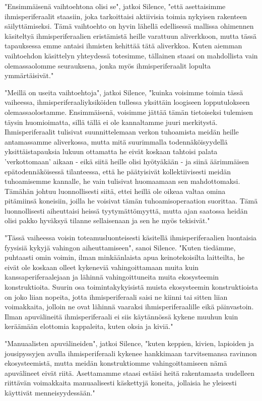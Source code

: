 "Ensimmäisenä vaihtoehtona olisi se", jatkoi Silence, "että asettaisimme ihmisperiferaalit staasiin, joka tarkoittaisi aktiivisia toimia nykyisen rakenteen säilyttämiseksi. Tämä vaihtoehto on hyvin lähellä edellisessä mallissa ohimennen käsiteltyä ihmisperiferaalien eristämistä heille varattuun aliverkkoon, mutta tässä tapauksessa emme antaisi ihmisten kehittää tätä aliverkkoa. Kuten aiemman vaihtoehdon käsittelyn yhteydessä totesimme, tällainen staasi on mahdollista vain olemassaolomme seurauksena, jonka myös ihmisperiferaalit lopulta ymmärtäisivät."


"Meillä on useita vaihtoehtoja", jatkoi Silence, "kuinka voisimme toimia tässä vaiheessa, ihmisperiferaaliyksiköiden tullessa yksittäin loogiseen lopputulokseen olemassaolostamme. Ensimmäisenä, voisimme jättää tämän tietoiseksi tulemisen täysin huomioimatta, sillä tällä ei ole kannaltamme juuri merkitystä. Ihmisperiferaalit tulisivat suunnittelemaan verkon tuhoamista meidän heille antamassamme aliverkossa, mutta mitä suurimmalla todennäköisyydellä yksittäistapauksia lukuun ottamatta he eivät koskaan tahtoisi palata 'verkottomaan' aikaan - eikä siitä heille olisi hyötyäkään - ja siinä äärimmäisen epätodennäköisessä tilanteessa, että he päätyisivät kollektiivisesti meidän tuhoamisemme kannalle, he vain tulisivat huomaamaan sen mahdottomaksi. Tämähän johtuu luonnollisesti siitä, ettei heillä ole oikeaa valtaa omina pitämiinsä koneisiin, joilla he voisivat tämän tuhoamisoperaation suorittaa. Tämä luonnollisesti aiheuttaisi heissä tyytymättömyyttä, mutta ajan saatossa heidän olisi pakko hyväksyä tilanne sellaisenaan ja sen he myös tekisivät."


"Tässä vaiheessa voisin toteamusluonteisesti käsitellä ihmisperiferaalien luontaisia fyysisiä kykyjä vahingon aiheuttamiseen", sanoi Silence. "Kuten tiedämme, puhtaasti omin voimin, ilman minkäänlaista apua keinotekoisilta laitteilta, he eivät ole koskaan olleet kykeneviä vahingoittamaan muita kuin kanssaperiferaalejaan ja lähinnä vahingoittuneita muita ekosysteemin konstruktioita. Suurin osa toimintakykyisistä muista ekosysteemin konstruktioista on joko liian nopeita, jotta ihmisperiferaali saisi ne kiinni tai sitten liian voimakkaita, jolloin ne ovat lähinnä vaaraksi ihmisperiferaalille eikä päinvastoin. Ilman apuvälineitä ihmisperiferaali ei siis käytännössä kykene muuhun kuin keräämään elottomia kappaleita, kuten oksia ja kiviä."


"Manuaalisten apuvälineiden", jatkoi Silence, "kuten keppien, kivien, lapioiden ja jousipyssyjen avulla ihmisperiferaali kykenee hankkimaan tarvitsemansa ravinnon ekosysteemistä, mutta meidän konstruktiomme vahingoittamiseen nämä apuvälineet eivät riitä. Asettamamme staasi estäisi heitä rakentamasta uudelleen riittävän voimakkaita manuaalisesti käskettyjä koneita, jollaisia he yleisesti käyttivät menneisyydessään."


